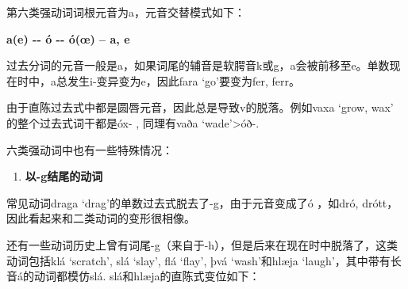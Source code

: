 第六类强动词词根元音为a，元音交替模式如下：

\textbf{a(e) -\/- ó -\/- ó(œ) -- a, e}

过去分词的元音一般是a，如果词尾的辅音是软腭音k或g，a会被前移至e。单数现在时中，a总发生i-变异变为e，因此fara
`go‌'要变为fer, ferr。

由于直陈过去式中都是圆唇元音，因此总是导致v的脱落。例如vaxa `grow, wax‌'
的整个过去式词干都是óx- , 同理有vaða `wade‌'\textgreater óð-.

六类强动词中也有一些特殊情况：

\begin{enumerate}
  \def\labelenumi{\arabic{enumi})}
  \item
        \textbf{以-g结尾的动词}
\end{enumerate}

常见动词draga `drag‌'的单数过去式脱去了-g，由于元音变成了ó ，如dró,
drótt，因此看起来和二类动词的变形很相像。

还有一些动词历史上曾有词尾-g（来自于-h），但是后来在现在时中脱落了，这类动词包括klá
`scratch', slá `slay', flá `flay', þvá `wash'和hlæja
`laugh‌'，其中带有长音á的动词都模仿slá. slá和hlæja的直陈式变位如下：

